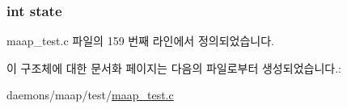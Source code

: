\subsubsection[{\texorpdfstring{state}{state}}]{\setlength{\rightskip}{0pt plus 5cm}int state}\hypertarget{structmaap__test__state_a89f234133d3efe315836311cbf21c64b}{}\label{structmaap__test__state_a89f234133d3efe315836311cbf21c64b}


maap\+\_\+test.\+c 파일의 159 번째 라인에서 정의되었습니다.



이 구조체에 대한 문서화 페이지는 다음의 파일로부터 생성되었습니다.\+:\begin{DoxyCompactItemize}
\item 
daemons/maap/test/\hyperlink{maap__test_8c}{maap\+\_\+test.\+c}\end{DoxyCompactItemize}

